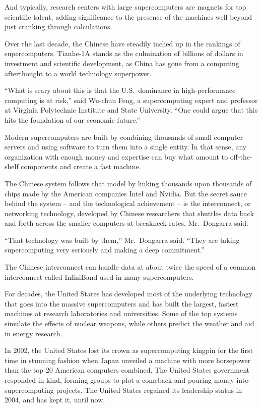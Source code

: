 ﻿\documentclass[12pt]{article}
\begin{document}
And typically, research centers with large supercomputers are magnets for top scientific talent,
adding significance to the presence of the machines well beyond just cranking through calculations.

Over the last decade, the Chinese have steadily inched up in the rankings of supercomputers.
Tianhe-1A stands as the culmination of billions of dollars in investment and scientific development,
as China has gone from a computing afterthought to a world technology superpower.

``What is scary about this is that the U.S.~dominance in high-performance computing is at risk,''
said Wu-chun Feng, a supercomputing expert and professor at Virginia Polytechnic Institute and State
University. ``One could argue that this hits the foundation of our economic future.''

Modern supercomputers are built by combining thousands of small computer servers and using software
to turn them into a single entity. In that sense, any organization with enough money and expertise
can buy what amount to off-the-shelf components and create a fast machine.

The Chinese system follows that model by linking thousands upon thousands of chips made by the
American companies Intel and Nvidia. But the secret sauce behind the system -- and the technological
achievement -- is the interconnect, or networking technology, developed by Chinese researchers that
shuttles data back and forth across the smaller computers at breakneck rates, Mr.~Dongarra said.

``That technology was built by them,'' Mr.~Dongarra said. ``They are taking supercomputing very
seriously and making a deep commitment.''

The Chinese interconnect can handle data at about twice the speed of a common interconnect called
InfiniBand used in many supercomputers.

For decades, the United States has developed most of the underlying technology that goes into the
massive supercomputers and has built the largest, fastest machines at research laboratories and
universities. Some of the top systems simulate the effects of nuclear weapons, while others predict
the weather and aid in energy research.

In 2002, the United States lost its crown as supercomputing kingpin for the first time in stunning
fashion when Japan unveiled a machine with more horsepower than the top 20 American computers
combined. The United States government responded in kind, forming groups to plot a comeback and
pouring money into supercomputing projects. The United States regained its leadership status in
2004, and has kept it, until now.
\end{document}
